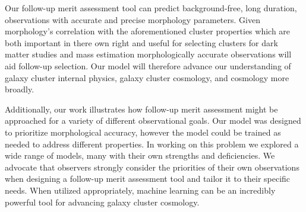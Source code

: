 Our follow-up merit assessment tool can predict background-free, long duration, observations with accurate and precise morphology parameters. Given morphology’s correlation with the aforementioned cluster properties \textemdash{} which are both important in there own right and useful for selecting clusters for dark matter studies and mass estimation \textemdash{} morphologically accurate observations will aid follow-up selection. Our model will therefore advance our understanding of galaxy cluster internal physics, galaxy cluster cosmology, and cosmology more broadly.

Additionally, our work illustrates how follow-up merit assessment might be approached for a variety of different observational goals. Our model was designed to prioritize morphological accuracy, however the model could be trained as needed to address different properties. In working on this problem we explored a wide range of models, many with their own strengths and deficiencies. We advocate that observers strongly consider the priorities of their own observations when designing a follow-up merit assessment tool and tailor it to their specific needs. When utilized appropriately, machine learning can be an incredibly powerful tool for advancing galaxy cluster cosmology.
